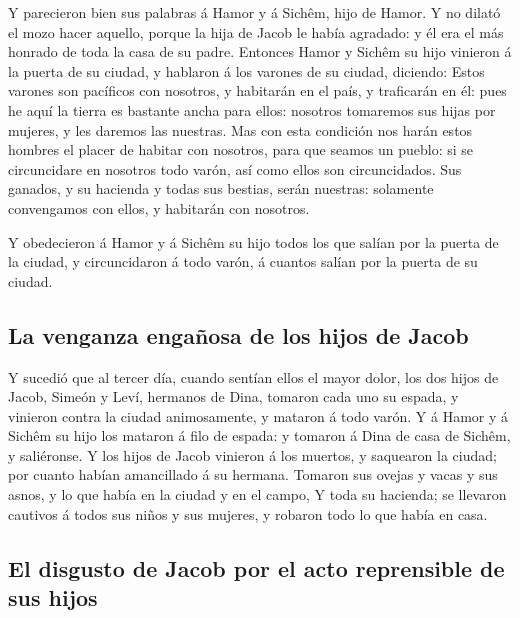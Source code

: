  Y parecieron bien sus palabras á Hamor y á Sichêm, hijo
de Hamor.  Y no dilató el mozo hacer aquello, porque la
hija de Jacob le había agradado: y él era el más honrado de toda la casa
de su padre.  Entonces Hamor y Sichêm su hijo vinieron á
la puerta de su ciudad, y hablaron á los varones de su ciudad, diciendo:
 Estos varones son pacíficos con nosotros, y habitarán en
el país, y traficarán en él: pues he aquí la tierra es bastante ancha
para ellos: nosotros tomaremos sus hijas por mujeres, y les daremos las
nuestras.  Mas con esta condición nos harán estos hombres
el placer de habitar con nosotros, para que seamos un pueblo: si se
circuncidare en nosotros todo varón, así como ellos son circuncidados.
 Sus ganados, y su hacienda y todas sus bestias, serán
nuestras: solamente convengamos con ellos, y habitarán con nosotros.

 Y obedecieron á Hamor y á Sichêm su hijo todos los que
salían por la puerta de la ciudad, y circuncidaron á todo varón, á
cuantos salían por la puerta de su ciudad.

\hypertarget{la-venganza-engauxf1osa-de-los-hijos-de-jacob}{%
\subsection{La venganza engañosa de los hijos de
Jacob}\label{la-venganza-engauxf1osa-de-los-hijos-de-jacob}}

 Y sucedió que al tercer día, cuando sentían ellos el
mayor dolor, los dos hijos de Jacob, Simeón y Leví, hermanos de Dina,
tomaron cada uno su espada, y vinieron contra la ciudad animosamente, y
mataron á todo varón.  Y á Hamor y á Sichêm su hijo los
mataron á filo de espada: y tomaron á Dina de casa de Sichêm, y
saliéronse.  Y los hijos de Jacob vinieron á los muertos,
y saquearon la ciudad; por cuanto habían amancillado á su hermana.
 Tomaron sus ovejas y vacas y sus asnos, y lo que había
en la ciudad y en el campo,  Y toda su hacienda; se
llevaron cautivos á todos sus niños y sus mujeres, y robaron todo lo que
había en casa.

\hypertarget{el-disgusto-de-jacob-por-el-acto-reprensible-de-sus-hijos}{%
\subsection{El disgusto de Jacob por el acto reprensible de sus
hijos}\label{el-disgusto-de-jacob-por-el-acto-reprensible-de-sus-hijos}}

